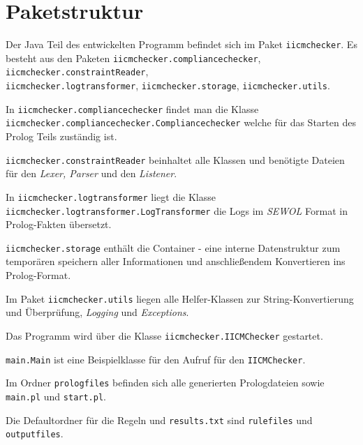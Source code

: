 
\chapter{Paketstruktur} %

\label{AppendixC} %


Der Java Teil des entwickelten Programm befindet sich im Paket \texttt{iicmchecker}.
Es besteht aus den Paketen \texttt{iicmchecker.compliancechecker}, \texttt{iicmchecker.constraintReader}, \\
\texttt{iicmchecker.logtransformer}, \texttt{iicmchecker.storage}, \texttt{iicmchecker.utils}.

In \texttt{iicmchecker.compliancechecker} findet man die Klasse \\\texttt{iicmchecker.compliancechecker.Compliancechecker} welche für das Starten des Prolog Teils zuständig ist.

\texttt{iicmchecker.constraintReader} beinhaltet alle Klassen und benötigte Dateien für den \textit{Lexer, Parser} und den \textit{Listener}.

In \texttt{iicmchecker.logtransformer} liegt die Klasse \texttt{iicmchecker.logtransformer.LogTransformer} die Logs im \textit{SEWOL} Format in Prolog-Fakten übersetzt.

\texttt{iicmchecker.storage} enthält die Container - eine interne Datenstruktur zum temporären speichern aller Informationen und anschließendem Konvertieren ins Prolog-Format.

Im Paket \texttt{iicmchecker.utils} liegen alle Helfer-Klassen zur String-Konvertierung und Überprüfung, \textit{Logging} und \textit{Exceptions}.

Das Programm wird über die Klasse \texttt{iicmchecker.IICMChecker} gestartet.


\texttt{main.Main} ist eine Beispielklasse für den Aufruf für den \texttt{IICMChecker}.


Im Ordner \texttt{prologfiles} befinden sich alle generierten Prologdateien sowie \texttt{main.pl} und \texttt{start.pl}.

Die Defaultordner für die Regeln und \texttt{results.txt} sind \texttt{rulefiles} und \texttt{outputfiles}.
